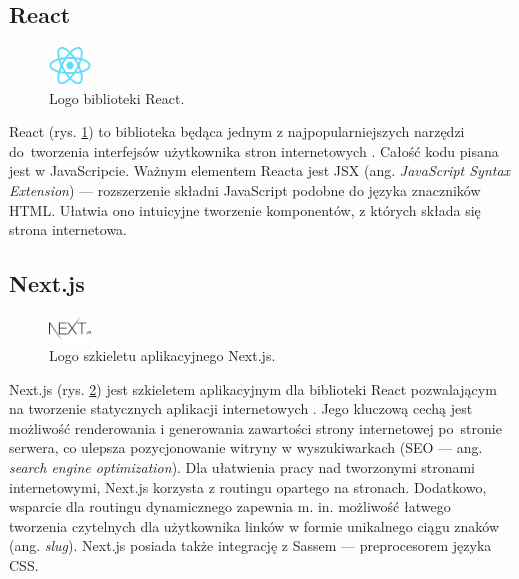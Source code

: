 \documentclass[a4paper, 12pt, twoside]{article}
\numberwithin{figure}{section}
\begin{document}
\begin{sloppypar}

\subsection*{React}

\begin{figure}[H] 
    \centering
        \includegraphics[width=0.1\textwidth]{images/react-logo.png}
   \caption{Logo biblioteki React.}
   \label{fig:react-logo.png}
\end{figure}

React (rys. \ref{fig:react-logo.png}) to biblioteka będąca jednym z najpopularniejszych narzędzi do~tworzenia interfejsów użytkownika stron internetowych \cite{react}. Całość kodu pisana jest w JavaScripcie. Ważnym elementem Reacta jest JSX (ang. \textit{JavaScript Syntax Extension}) --- rozszerzenie składni JavaScript podobne do języka znaczników HTML. Ułatwia ono intuicyjne tworzenie komponentów, z których składa się strona internetowa.


\subsection*{Next.js}

\begin{figure}[H] 
    \centering
        \includegraphics[width=0.1\textwidth]{images/next-logo.png}
   \caption{Logo szkieletu aplikacyjnego Next.js.}
    \label{fig:next-logo.png}
\end{figure}

Next.js (rys. \ref{fig:next-logo.png}) jest szkieletem aplikacyjnym dla biblioteki React pozwalającym na tworzenie statycznych aplikacji internetowych \cite{next}. Jego kluczową cechą jest możliwość renderowania i generowania zawartości strony internetowej po~stronie serwera, co ulepsza pozycjonowanie witryny w wyszukiwarkach (SEO --- ang. \textit{search engine optimization}). Dla ułatwienia pracy nad tworzonymi stronami internetowymi, Next.js korzysta z routingu opartego na stronach. Dodatkowo, wsparcie dla routingu dynamicznego zapewnia m. in. możliwość łatwego tworzenia czytelnych dla użytkownika linków w formie unikalnego ciągu znaków (ang. \textit{slug}). Next.js posiada także integrację z Sassem --- preprocesorem języka CSS.


\end{sloppypar}
\end{document}
